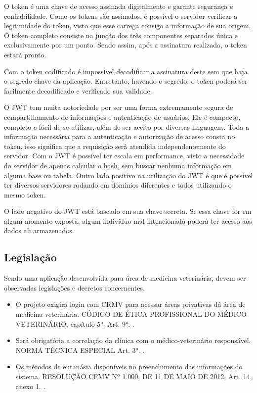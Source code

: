\documentclass[
    12pt,               %
    openright,          %
    oneside,
    a4paper,            %
    BIBLATEX,           %
    TODO,               %
    english,            %
    brazil              %
    ]{ifsp-spo-inf-ctds}
\begin{document}
            O token é uma chave de acesso assinada digitalmente e garante segurança e confiabilidade. Como os tokens são assinados, é possível o servidor verificar a legitimidade do token, visto que esse carrega consigo a informação de sua origem. O token completo consiste na junção dos três componentes separados única e exclusivamente por um ponto. Sendo assim, após a assinatura realizada, o token estará pronto. 
            
            Com o token codificado é impossível decodificar a assinatura deste sem que haja o segredo-chave da aplicação. Entretanto, havendo o segredo, o token poderá ser facilmente decodificado e verificado sua validade. 
            
            O JWT tem muita notoriedade por ser uma forma extremamente segura de compartilhamento de informações e autenticação de usuários. Ele é compacto, completo e fácil de se utilizar, além de ser aceito por diversas linguagens. Toda a informação necessária para a autenticação e autorização de acesso consta no token, isso significa que a requisição será atendida independentemente do servidor. Com o JWT é possível ter escala em performance, visto a necessidade do servidor de apenas calcular o hash, sem buscar nenhuma informação em alguma base ou tabela. Outro lado positivo na utilização do JWT é que é possível ter diversos servidores rodando em domínios diferentes e todos utilizando o mesmo token.
            
            O lado negativo do JWT está baseado em sua chave secreta. Se essa chave for em algum momento exposta, algum indivíduo mal intencionado poderá ter acesso aos dados ali armazenados.

    
        \subsection{Legislação}
        
            Sendo uma aplicação desenvolvida para área de medicina veterinária, devem ser observadas legislações e decretos concernentes.
        
            \begin{itemize}
            
                \item O projeto exigirá login com CRMV para acessar áreas privativas dá área de medicina veterinária. CÓDIGO DE ÉTICA PROFISSIONAL DO MÉDICO-VETERINÁRIO, capítulo 5°, Art. 9°. \cite{manual}.
                
                \item Será obrigatória a correlação da clínica com o médico-veterinário responsável. NORMA TÉCNICA ESPECIAL Art. 3°. \cite{manual}.
                
                \item Os métodos de eutanásia disponíveis no preenchimento das informações do sistema. RESOLUÇÃO CFMV Nº 1.000, DE 11 DE MAIO DE 2012, Art. 14, anexo 1. \cite{manual}.
                
            \end{itemize}
        
\end{document}

